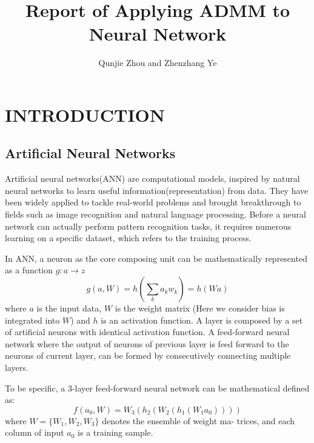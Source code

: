 \documentclass[letterpaper, 10 pt, conference]{ieeeconf}  %
\title{\LARGE \bf
Report of Applying ADMM to Neural Network
}
\author{Qunjie Zhou and Zhenzhang Ye%
}
\begin{document}
\maketitle
\thispagestyle{empty}
\pagestyle{empty}

\section{INTRODUCTION}
\subsection{Artificial Neural Networks} 
Artificial neural networks(ANN) are computational models, inspired by natural neural networks to learn useful information(representation) from data. They have been widely applied to tackle real-world problems and brought breakthrough to fields such as image recognition and natural language processing.  Before a neural network can actually perform pattern recognition tasks, it requires numerous learning on a specific dataset, which refers to the training process.
 
 In ANN, a neuron as the core composing unit can be mathematically represented as a function $g: a \rightarrow z$
 \begin{equation}
	g(a, W)= h(\displaystyle\sum_{k}a_kw_k) = h(Wa)
\end{equation}
where $a$ is the input data, $W$ is the weight matrix (Here we consider bias is integrated into $W$) and $h$ is an activation function\cite{1}. A layer is composed by a set of artificial neurons with identical activation function. A feed-forward neural network where the output of neurons of previous layer is feed forward to the neurons of current layer, can be formed by consecutively connecting multiple layers.

To be specific, a 3-layer feed-forward neural network can be mathematical defined as:
\begin{equation} \label{eq:network}
	f(a_0, W) = W_3(h_2(W_2(h_1(W_1a_0))))
\end{equation}
where $W = \{W_1, W_2, W_3\}$ denotes the ensemble of weight ma- trices, and each column of input $a_0$ is a training sample.
\end{document}
